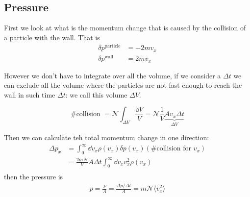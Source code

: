 \documentclass[14pt]{extarticle}
\newcommand{\anglebraces}[1]{
    \langle #1 \rangle
}
\begin{document}
\subsection{Pressure}

First we look at what is the momentum change that is caused by the collision of a particle with the wall.
That is
\begin{align}
    \delta p^\text{particle} & = -2 m v_x \\
    \delta p^\text{wall}     & = 2 m v_x
\end{align}

However we don't have to integrate over all the volume, if we consider a $\Delta t$ we can exclude all the volume where the particles are not fast enough to reach the wall in such time $\Delta t$: we call this volume $\Delta V$.

\begin{equation}
    \text{\# collision } = \mathscr{N} \int_{\Delta V} \frac{\dd{V}}{V} = \mathscr{N} \frac{1}{V} \underbrace{A v_x \Delta t}_{\Delta V}
\end{equation}

Then we can calculate teh total momentum change in one direction:
\begin{align}
    \Delta p_x & = \int_0^\infty \dd{v_x} \rho(v_x) \delta p(v_x) (\text{\# collision for }v_x) \\
               & =\frac{2m \mathscr{N}}{V} A \Delta t \int_0^\infty \dd{v_x} v_x^2 \rho(v_x)    \\
\end{align}
then the pressure is
\begin{align}
    p = \frac{F}{A} = \frac{\Delta p / \Delta t}{A} = m \mathscr{N} \anglebraces{v_x^2}
\end{align}
\end{document}
